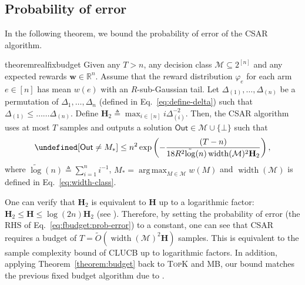 \documentclass{article}
\newcommand{\Algorithm}{{\small \textsf{CLUCB}}\xspace}
\newcommand{\AlgorithmBud}{{\small \textsf{CSAR}}\xspace}
\newcommand{\Rew}{\varphi}
\newcommand{\M}{\mathcal M}
\newcommand{\RR}{\mathbb R}
\DeclareMathOperator{\rank}{width}
\DeclareMathOperator*{\argmax}{arg\,max}
\newcommand{\out}{\mathsf{Out}}
\newcommand{\barlog}{\tilde{\log}}
\let\Pr\undefined
\DeclareMathOperator{\Pr}{Pr}
\newcommand{\MultiIdent}{\textsc{TopK}\xspace}
\newcommand{\MultiBandit}{\textsc{MB}\xspace}
\renewcommand{\vec}[1]{\boldsymbol{#1}}
\begin{document}
\subsection{Probability of error}
\vspace{-0.5em}
In the following theorem, we bound the probability of error of the \AlgorithmBud algorithm.
\begin{restatable}{theorem}{realfixbudget}
Given any $T>n$, any decision class $\M \subseteq 2^{[n]}$ and any expected rewards $\vec w \in \RR^{n}$.
Assume that the reward distribution $\Rew_e$ for each arm $e\in [n]$ has mean $w(e)$ with an $R$-sub-Gaussian tail.
Let $\Delta_{(1)},\ldots,\Delta_{(n)}$ be a permutation of $\Delta_1,\ldots,\Delta_n$ (defined in Eq.~\eqref{eq:define-delta}) such that
$\Delta_{(1)} \le \ldots \ldots \Delta_{(n)}$. 
Define $\mathbf H_2 \triangleq \max_{i\in[n]} i\Delta_{(i)}^{-2}$.
Then, the \AlgorithmBud algorithm uses at most $T$ samples and outputs a solution $\out \in \M \cup \{\bot\}$ such that
\begin{equation}
\Pr[\out\not=M_*] \le n^2  \exp\left(-\frac{(T-n)}{18 R^2 \barlog(n) \rank(\M)^2 \mathbf H_2} \right),
\label{eq:fbudget:prob-error}
\end{equation}
where $\barlog(n)\triangleq \sum_{i=1}^n i^{-1}$, $M_* = \argmax_{M\in \M} w(M)$ and $\rank(\M)$ is defined in Eq.~\eqref{eq:width-class}.
\label{theorem:budget}
\end{restatable}
One can verify that $\mathbf H_2$ is equivalent to $\mathbf H$ up to a logarithmic factor: $\mathbf H_2 \le \mathbf H \le \log(2n) \mathbf H_2$ (see \citep{audibert2010best}).
Therefore, by setting the probability of error (the RHS of Eq.~\eqref{eq:fbudget:prob-error}) to a constant, one can see that \AlgorithmBud requires a budget of $T = \tilde O(\rank(\M)^2 \mathbf H)$ samples.
This is equivalent to the sample complexity bound of \Algorithm up to logarithmic factors.
In addition, applying Theorem~\ref{theorem:budget} back to \MultiIdent and \MultiBandit, our bound matches the previous fixed budget algorithm due to \citet{bubeck2013multiple}.
\end{document}
